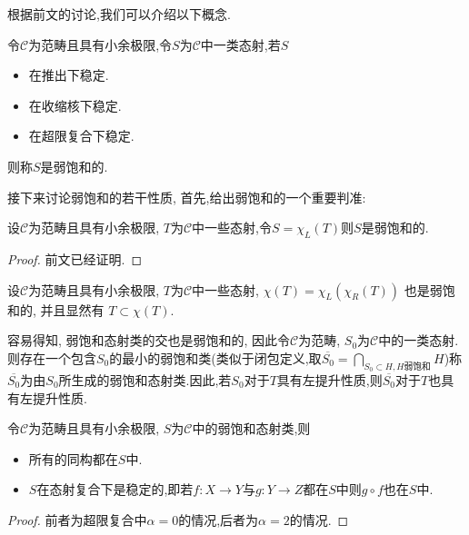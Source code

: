 根据前文的讨论,我们可以介绍以下概念.
\begin{definition}[弱饱和]
    令$\mathcal{C}$为范畴且具有小余极限,令$S$为$\mathcal{C}$中一类态射,若$S$
    \begin{itemize}
        \item 在推出下稳定.
        \item 在收缩核下稳定.
        \item 在超限复合下稳定.
    \end{itemize}
    则称$S$是弱饱和的.
\end{definition}

接下来讨论弱饱和的若干性质, 首先,给出弱饱和的一个重要判准:
\begin{proposition}[重要]
    设$\mathcal{C}$为范畴且具有小余极限, $T$为$\mathcal{C}$中一些态射,令$S = \chi_L(T)$则$S$是弱饱和的.
\end{proposition}
\begin{proof}
    前文已经证明.
\end{proof}
\begin{corollary}\label{推论:chi(T)}
    设$\mathcal{C}$为范畴且具有小余极限, $T$为$\mathcal{C}$中一些态射, $\chi(T) = \chi_L(\chi_R(T))$ 也是弱饱和的, 并且显然有 $T \subset \chi(T)$.
\end{corollary}
 
\begin{remark}[生成的弱饱和态射类]\label{注记:生成的弱饱和态射类}
    容易得知, 弱饱和态射类的交也是弱饱和的, 因此令$\mathcal{C}$为范畴, $S_0$为$\mathcal{C}$中的一类态射.则存在一个包含$S_0$的最小的弱饱和类(类似于闭包定义,取$\overline{S_0} = \bigcap_{S_0 \subset H,H\text{弱饱和}}H$)称$\overline{S_0}$为由$S_0$所生成的弱饱和态射类.因此,若$S_0$对于$T$具有左提升性质,则$\overline{S_0}$对于$T$也具有左提升性质.
\end{remark}
\begin{proposition}
    令$\mathcal{C}$为范畴且具有小余极限, $S$为$\mathcal{C}$中的弱饱和态射类,则
    \begin{itemize}
        \item 所有的同构都在$S$中.
        \item $S$在态射复合下是稳定的,即若$f:X \to Y$与$g : Y \to Z$都在$S$中则$g\circ f$也在$S$中.
    \end{itemize}
\end{proposition}
\begin{proof}    
    前者为超限复合中$\alpha = 0$的情况,后者为$\alpha = 2$的情况.
\end{proof}


